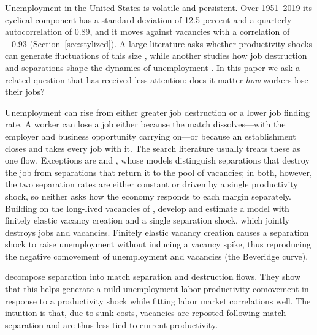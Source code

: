 \documentclass[authoryear, review, 12pt]{elsarticle}
\begin{document}
Unemployment in the United States is volatile and persistent. Over 1951--2019 its cyclical component has a standard deviation of 12.5 percent and a quarterly autocorrelation of 0.89, and it moves against vacancies with a correlation of $-0.93$ (Section~\ref{sec:stylized}).
A large literature asks whether productivity shocks can generate fluctuations of this size \citep{shimer_2005, hagedorn_2008, pissarides_2009}, while another studies how job destruction and separations shape the dynamics of unemployment \citep{mortensen_1994, den_haan_2000, elsby_2013}. In this paper we ask a related question that has received less attention: does it matter \emph{how} workers lose their jobs?

Unemployment can rise from either greater job destruction or a lower job finding rate. A worker can lose a job either because the match dissolves---with the employer and business opportunity carrying on---or because an establishment closes and takes every job with it. The search literature usually treats these as one flow. Exceptions are \citet{fujita_2007} and \citet{haefke_2020}, whose models distinguish separations that destroy the job from separations that return it to the pool of vacancies; in both, however, the two separation rates are either constant or driven by a single productivity shock, so neither asks how the economy responds to each margin separately.
Building on the long-lived vacancies of \citet{fujita_2007}, \citet{coles_2018} develop and estimate a model with finitely elastic vacancy creation and a single separation shock, which jointly destroys jobs and vacancies. Finitely elastic vacancy creation causes a separation shock to raise unemployment without inducing a vacancy spike, thus reproducing the negative comovement of unemployment and vacancies (the Beveridge curve).

\citet{gabrovski_2025} decompose separation into match separation and destruction flows. They show that this helps generate a mild unemployment-labor productivity comovement in response to a productivity shock while fitting labor market correlations well. The intuition is that, due to sunk costs, vacancies are reposted following match separation and are thus less tied to current productivity.
\end{document}
